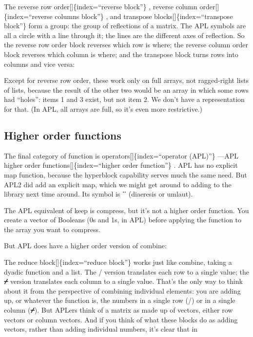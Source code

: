 \documentclass[
  letterpaper,
]{book}
\begin{document}
The reverse row order{[}{]}\{index=``reverse block''\} , reverse column
order{[}{]}\{index=``reverse columns block''\} , and transpose
blocks{[}{]}\{index=``transpose block''\} form a group: the group of
reflections of a matrix. The APL symbols are all a circle with a line
through it; the lines are the different axes of reflection. So the
reverse row order block reverses which row is where; the reverse column
order block reverses which column is where; and the transpose block
turns rows into columns and vice versa:

Except for reverse row order, these work only on full arrays, not
ragged-right lists of lists, because the result of the other two would
be an array in which some rows had ``holes'': items 1 and 3 exist, but
not item 2. We don't have a representation for that. (In APL, all arrays
are full, so it's even more restrictive.)

\subsection{Higher order functions}\label{higher-order-functions}

The final category of function is operators{[}{]}\{index=``operator
(APL)''\} ---APL higher order functions{[}{]}\{index=``higher order
function''\} . APL has no explicit map function, because the hyperblock
capability serves much the same need. But APL2 did add an explicit map,
which we might get around to adding to the library next time around. Its
symbol is \textbf{¨} (diaeresis or umlaut).

The APL equivalent of keep is compress, but it's not a higher order
function. You create a vector of Booleans (0s and 1s, in APL) before
applying the function to the array you want to compress.

But APL does have a higher order version of combine:

The reduce block{[}{]}\{index=``reduce block''\} works just like
combine, taking a dyadic function and a list. The / version translates
each row to a single value; the \textbf{⌿} version translates each
column to a single value. That's the only way to think about it from the
perspective of combining individual elements: you are adding up, or
whatever the function is, the numbers in a single row (/) or in a single
column (\textbf{⌿}). But APLers think of a matrix as made up of vectors,
either row vectors or column vectors. And if you think of what these
blocks do as adding vectors, rather than adding individual numbers, it's
clear that in
\end{document}
